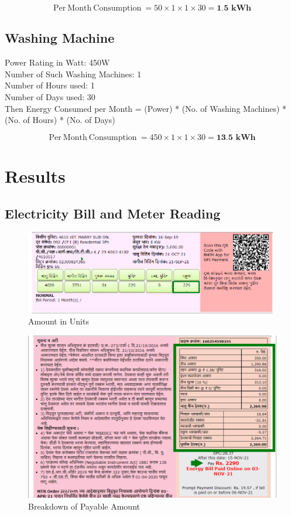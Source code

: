 \documentclass[11pt,a4paper]{article}
\begin{document}
$$
\mathrm{Per\ Month\ Consumption\ } = 50 \times 1 \times 1 \times 30 = \textbf{1.5\ kWh}
$$

\subsection{Washing Machine}

\noindent
Power Rating in Watt: 450W\\
Number of Such Washing Machines: 1\\
Number of Hours used: 1\\
Number of Days used: 30\\

Then Energy Consumed per Month = (Power) * (No. of Washing Machines) * (No. of Hours) * (No. of Days)

$$
\mathrm{Per\ Month\ Consumption\ } = 450 \times 1 \times 1 \times 30 = \textbf{13.5\ kWh}
$$


\section{Results}

\subsection{Electricity Bill and Meter Reading}
\begin{figure}[H]
	\centering
	\includegraphics[scale=0.74]{bill.png}
	\caption{Amount in Units}
\end{figure}

\begin{figure}[H]
	\centering
	\includegraphics[scale=0.7]{bill 2.png}
	\caption{Breakdown of Payable Amount}
\end{figure}
\end{document}
